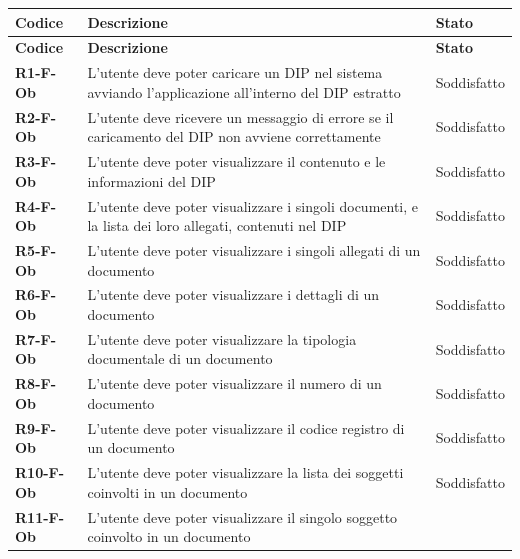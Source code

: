 \documentclass[a4paper,12pt]{article}
\begin{document}
{{{\begin{longtable}{|>{\centering\arraybackslash}m{}|>{\centering\arraybackslash}m{}|>{\centering\arraybackslash}m{}|}
                \hline
                \rowcolor{lightgray}
                \textbf{Codice} & \textbf{Descrizione} & \textbf{Stato} \\
                \hline
                \endfirsthead
                
                \hline
                \rowcolor{lightgray}
                \textbf{Codice} & \textbf{Descrizione} & \textbf{Stato} \\
                \hline
                \endhead
                
                \textbf{R1-F-Ob} & L'utente deve poter caricare un DIP nel sistema avviando l'applicazione all'interno del DIP estratto & 
                Soddisfatto \\
                \hline
                \textbf{R2-F-Ob} & L'utente deve ricevere un messaggio di errore se il caricamento del DIP non avviene correttamente & 
                Soddisfatto \\
                \hline
                \textbf{R3-F-Ob} & L'utente deve poter visualizzare il contenuto e le informazioni del DIP & Soddisfatto \\ 
                \hline
                \textbf{R4-F-Ob} & L'utente deve poter visualizzare i singoli documenti, e la lista dei loro allegati, contenuti nel DIP & 
                Soddisfatto \\ 
                \hline
                \textbf{R5-F-Ob} & L'utente deve poter visualizzare i singoli allegati di un documento & Soddisfatto \\ 
                \hline
                \textbf{R6-F-Ob} & L'utente deve poter visualizzare i dettagli di un documento & Soddisfatto \\ 
                \hline
                \textbf{R7-F-Ob} & L'utente deve poter visualizzare la tipologia documentale di un documento & Soddisfatto \\
                \hline
                \textbf{R8-F-Ob} & L'utente deve poter visualizzare il numero di un documento & Soddisfatto \\
                \hline
                \textbf{R9-F-Ob} & L'utente deve poter visualizzare il codice registro di un documento & Soddisfatto \\
                \hline
                \textbf{R10-F-Ob} & L'utente deve poter visualizzare la lista dei soggetti coinvolti in un documento & Soddisfatto \\ 
                \hline
                \textbf{R11-F-Ob} & L'utente deve poter visualizzare il singolo soggetto coinvolto in un documento & 

\end{longtable}}}}
\end{document}
